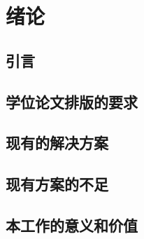 \chapter{绪论}\label{chapter:introduction}

\section{引言}

\section{学位论文排版的要求}

\section{现有的解决方案}

\section{现有方案的不足}

\section{本工作的意义和价值}
